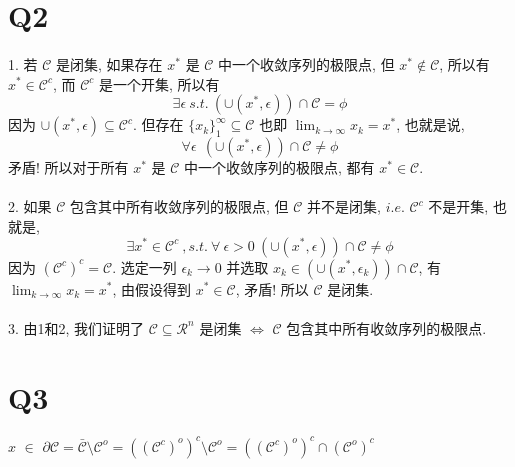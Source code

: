 \documentclass{article}
\begin{document}
\begin{CJK}{UTF8}{gbsn}
\section{Q2}
  \paragraph{}
    1. 若 $\mathcal{C}$ 是闭集, 如果存在 $x^*$ 是 $\mathcal{C}$ 中一个收敛序列的极限点, 但 $x^* \not\in \mathcal{C}$, 所以有 $x^* \in \mathcal{C}^c$, 而 $\mathcal{C}^c$ 是一个开集, 所以有
    \begin{equation}
      \exists \epsilon\ s.t.\ (\cup(x^*, \epsilon)) \cap \mathcal{C} = \phi
    \end{equation}
    因为 $\cup(x^*, \epsilon) \subseteq \mathcal{C}^c$. 但存在 $\{x_k\}_1^{\infty} \subseteq \mathcal{C}$ 也即 $\lim_{k \to \infty} x_k = x^*$, 也就是说,
    \begin{equation}
      \forall \epsilon\ \ (\cup(x^*, \epsilon)) \cap \mathcal{C} \not= \phi
    \end{equation}
    矛盾! 所以对于所有 $x^*$ 是 $\mathcal{C}$ 中一个收敛序列的极限点, 都有 $x^* \in \mathcal{C}$.
    \paragraph{}
      2. 如果 $\mathcal{C}$ 包含其中所有收敛序列的极限点, 但 $\mathcal{C}$ 并不是闭集, $i.e.$ $\mathcal{C}^c$ 不是开集, 也就是,
      \begin{equation}
        \exists x^* \in \mathcal{C}^c\ ,s.t.\ \forall\ \epsilon > 0\ (\cup(x^*, \epsilon)) \cap \mathcal{C} \not= \phi
      \end{equation}
      因为 $(\mathcal{C}^c)^c = \mathcal{C}$. 选定一列 $\epsilon_k \to 0$ 并选取 $x_k \in (\cup(x^*, \epsilon_k)) \cap \mathcal{C}$, 有 $\lim_{k \to \infty} x_k = x^*$, 由假设得到 $x^* \in \mathcal{C}$, 矛盾! 所以 $\mathcal{C}$ 是闭集.
    \paragraph{}
      3. 由1和2, 我们证明了 $\mathcal{C} \subseteq \mathcal{R}^n$ 是闭集 $\iff$ $\mathcal{C}$ 包含其中所有收敛序列的极限点.

\section{Q3}
  \paragraph{}
  $x$ $\in$ $\partial\mathcal{C} = \bar{\mathcal{C}} \setminus \mathcal{C}^o = ((\mathcal{C}^c)^o)^c \setminus \mathcal{C}^o = ((\mathcal{C}^c)^o)^c \cap (\mathcal{C}^o)^c$

\end{CJK}
\end{document}
